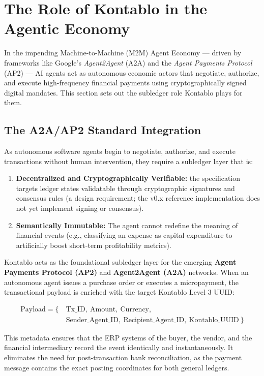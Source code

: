 \section{The Role of Kontablo in the Agentic Economy}
\label{sec:agentic}

In the impending Machine-to-Machine (M2M) Agent Economy --- driven by frameworks
like Google's \textit{Agent2Agent} (A2A) and the \textit{Agent Payments Protocol}
(AP2) --- AI agents act as autonomous economic actors that negotiate, authorize,
and execute high-frequency financial payments using cryptographically signed
digital mandates. This section sets out the subledger role Kontablo plays for
them.

\subsection{The A2A/AP2 Standard Integration}
As autonomous software agents begin to negotiate, authorize, and execute transactions without human intervention, they require a subledger layer that is:

\begin{enumerate}
    \item \textbf{Decentralized and Cryptographically Verifiable:} the specification targets ledger states validatable through cryptographic signatures and consensus rules (a design requirement; the v0.x reference implementation does not yet implement signing or consensus).
    \item \textbf{Semantically Immutable:} The agent cannot redefine the meaning of financial events (e.g., classifying an expense as capital expenditure to artificially boost short-term profitability metrics).
\end{enumerate}

Kontablo acts as the foundational subledger layer for the emerging \textbf{Agent Payments Protocol (AP2)} and \textbf{Agent2Agent (A2A)} networks. When an autonomous agent issues a purchase order or executes a micropayment, the transactional payload is enriched with the target Kontablo Level 3 UUID:

\begin{align*}
\text{Payload} = \{\ &\text{Tx\_ID},\ \text{Amount},\ \text{Currency},\\
                     &\text{Sender\_Agent\_ID},\ \text{Recipient\_Agent\_ID},\ \text{Kontablo\_UUID}\ \}
\end{align*}

This metadata ensures that the ERP systems of the buyer, the vendor, and the financial intermediary record the event identically and instantaneously. It eliminates the need for post-transaction bank reconciliation, as the payment message contains the exact posting coordinates for both general ledgers.

